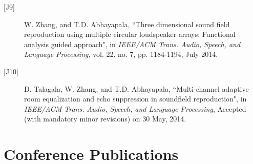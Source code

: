 \documentclass[11pt]{article}
\begin{document}
\begin{description}
\item[{[}J9{]}]W. Zhang, and T.D. Abhayapala, ``Three dimensional sound field reproduction using multiple circular loudspeaker arrays: Functional analysis guided approach", in {\em IEEE/ACM Trans. Audio, Speech, and Language Processing}, vol. 22. no. 7, pp. 1184-1194, July 2014. 

\item[{[}J10{]}]D. Talagala, W. Zhang, and T.D. Abhayapala, ``Multi-channel adaptive room equalization and echo suppression in soundfield reproduction", in {\em IEEE/ACM Trans. Audio, Speech, and Language Processing},  Accepted (with mandatory minor revisions) on 30 May, 2014.

\end{description}

\section*{Conference Publications}
\end{document}
